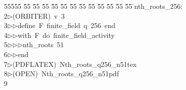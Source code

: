 %
%
\begin{tabbing}
55555 \= 55 \= 55 \= 55 \= 55 \= 55 \= 55 \= 55 \= 55 \= 55 \= 55 \= 55 \= 55 \= \>nth\_roots\_256:\\[0pt]
2\>$\triangleright$\>(ORBITER)\ v\ 3\ \\[0pt]
3\>$\triangleright$\>$\triangleright$\>define\ F\ finite\_field\ q\ 256\ end\ \\[0pt]
4\>$\triangleright$\>$\triangleright$\>with\ F\ do\ finite\_field\_activity\ \\[0pt]
5\>$\triangleright$\>$\triangleright$\>$\triangleright$\>nth\_roots\ 51\ \\[0pt]
6\>$\triangleright$\>$\triangleright$\>end\\[0pt]
7\>$\triangleright$\>(PDFLATEX)\ Nth\_roots\_q256\_n51tex\\[0pt]
8\>$\triangleright$\>(OPEN)\ Nth\_roots\_q256\_n51pdf\\[0pt]
9\>\end{tabbing}
